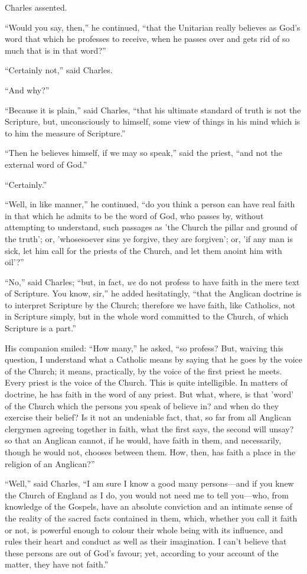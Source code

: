 Charles assented.

``Would you say, then,'' he continued, ``that the
Unitarian really believes as God's word that which he professes to
receive, when he passes over and gets rid of so much that is in that
word?''

``Certainly not,'' said Charles.

``And why?''

``Because it is plain,'' said Charles, ``that his
ultimate standard of truth is not the Scripture, but, unconsciously to
himself, some view of things in his mind which is to him the measure
of Scripture.''

``Then he believes himself, if we may so speak,'' said the
priest, ``and not the external word of God.''

``Certainly.''

``Well, in like manner,'' he continued, ``do you think
a person can have real faith in that which he admits to be the word of
God, who passes by, without attempting to understand, such passages as
'the Church the pillar and ground of the truth'; or, 'whosesoever sins
ye forgive, they are forgiven'; or, 'if any man is sick, let him call
for the priests of the Church, and let them anoint him with
oil'?''

``No,'' said Charles; ``but, in fact, \emph{we} do not
profess to have faith in the mere text of Scripture. You know,
sir,'' he added hesitatingly, ``that the Anglican doctrine is
to interpret Scripture by the Church; therefore we have faith, like
Catholics, not in Scripture simply, but in the whole word committed to
the Church, of which Scripture is a part.''

His companion smiled: ``How many,'' he asked, ``so
profess? But, waiving this question, I understand what a Catholic
means by saying that he goes by the voice of the Church; it means,
practically, by the voice of the first priest he meets. Every priest
is the voice of the Church. This is quite intelligible. In matters of
doctrine, he has faith in the word of any priest. But what, where, is
that 'word' of the Church which the persons you speak of believe in?
and when do they exercise their belief? Is it not an undeniable fact,
that, so far from all Anglican clergymen agreeing together in faith,
what the first says, the second will unsay? so that an Anglican
cannot, if he would, have faith in them, and necessarily, though he
would not, chooses between them. How, then, has faith a place in the
religion of an Anglican?''

``Well,'' said Charles, ``I am sure I know a good many
persons—and if you knew the Church of England as I do, you would not
need me to tell you—who, from knowledge of the Gospels, have an
absolute conviction and an intimate sense of the reality of the sacred
facts contained in them, which, whether you call it faith or not, is
powerful enough to colour their whole being with its influence, and
rules their heart and conduct as well as their imagination. I
can't believe that these persons are out of God's favour; yet,
according to your account of the matter, they have not faith.''

